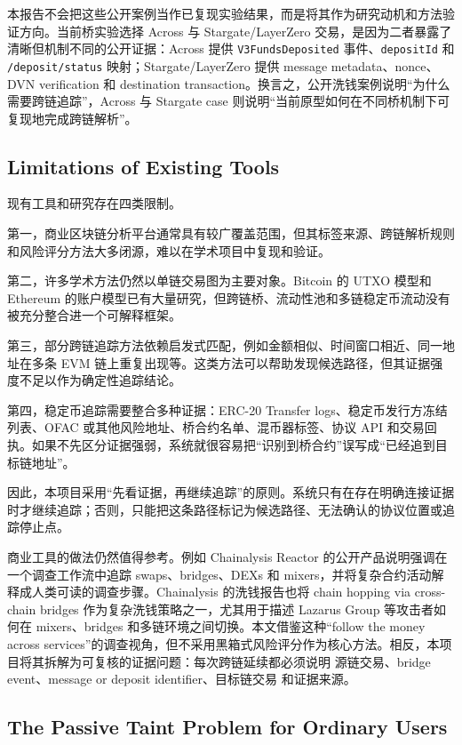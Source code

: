 \documentclass[12pt,a4paper]{ctexart}
\begin{document}
本报告不会把这些公开案例当作已复现实验结果，而是将其作为研究动机和方法验证方向。当前桥实验选择
Across 与 Stargate/LayerZero
交易，是因为二者暴露了清晰但机制不同的公开证据：Across 提供
\texttt{V3FundsDeposited} 事件、\texttt{depositId} 和
\texttt{/deposit/status} 映射；Stargate/LayerZero 提供 message
metadata、nonce、DVN verification 和 destination
transaction。换言之，公开洗钱案例说明``为什么需要跨链追踪''，Across 与
Stargate case 则说明``当前原型如何在不同桥机制下可复现地完成跨链解析''。

\hypertarget{limitations-of-existing-tools}{%
\subsection{Limitations of Existing
Tools}\label{limitations-of-existing-tools}}

现有工具和研究存在四类限制。

第一，商业区块链分析平台通常具有较广覆盖范围，但其标签来源、跨链解析规则和风险评分方法大多闭源，难以在学术项目中复现和验证。

第二，许多学术方法仍然以单链交易图为主要对象。Bitcoin 的 UTXO 模型和
Ethereum
的账户模型已有大量研究，但跨链桥、流动性池和多链稳定币流动没有被充分整合进一个可解释框架。

第三，部分跨链追踪方法依赖启发式匹配，例如金额相似、时间窗口相近、同一地址在多条
EVM
链上重复出现等。这类方法可以帮助发现候选路径，但其证据强度不足以作为确定性追踪结论。

第四，稳定币追踪需要整合多种证据：ERC-20 Transfer
logs、稳定币发行方冻结列表、OFAC 或其他风险地址、桥合约名单、混币器标签、协议 API 和交易回执。如果不先区分证据强弱，系统就很容易把``识别到桥合约''误写成``已经追到目标链地址''。

因此，本项目采用“先看证据，再继续追踪”的原则。系统只有在存在明确连接证据时才继续追踪；否则，只能把这条路径标记为候选路径、无法确认的协议位置或追踪停止点。

商业工具的做法仍然值得参考。例如 Chainalysis Reactor
的公开产品说明强调在一个调查工作流中追踪 swaps、bridges、DEXs 和
mixers，并将复杂合约活动解释成人类可读的调查步骤。Chainalysis
的洗钱报告也将 chain hopping via cross-chain bridges
作为复杂洗钱策略之一，尤其用于描述 Lazarus Group 等攻击者如何在
mixers、bridges 和多链环境之间切换。本文借鉴这种``follow the money
across
services''的调查视角，但不采用黑箱式风险评分作为核心方法。相反，本项目将其拆解为可复核的证据问题：每次跨链延续都必须说明
源链交易、bridge event、message or deposit
identifier、目标链交易 和证据来源。

\hypertarget{the-passive-taint-problem-for-ordinary-users}{%
\subsection{The Passive Taint Problem for Ordinary
Users}\label{the-passive-taint-problem-for-ordinary-users}}
\end{document}
